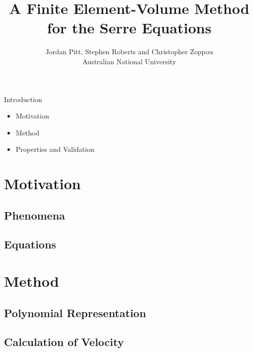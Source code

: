 \documentclass[pdf]{beamer}
\title{A Finite Element-Volume Method for the Serre Equations}
\author{Jordan Pitt, Stephen Roberts and Christopher Zoppou \\ Australian National University}
\begin{document}
\begin{frame}
\titlepage
\end{frame}

 
\begin{frame}{Introduction}
\begin{itemize}
	\item Motivation
	\item Method
	\item Properties and Validation
\end{itemize}
\end{frame}
\section{Motivation}
\begin{frame}
\end{frame}
\subsection{Phenomena}
\begin{frame}
\end{frame}
\subsection{Equations}
\begin{frame}
\end{frame}

\section{Method}
\begin{frame}
\end{frame}
\subsection{Polynomial Representation}
\begin{frame}
\end{frame}
\subsection{Calculation of Velocity}
\begin{frame}
\end{frame}
\end{document}
